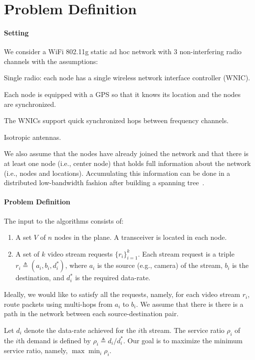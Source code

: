 \documentclass[12pt]{article}
\newenvironment{proof sketch}[1]{\noindent {\emph{Proof sketch of #1:}}}{\hfill \qed}
\newcommand{\eqdf}{\triangleq}
\begin{document}
\section{Problem Definition}\label{sec:problem}
\paragraph{Setting}
We consider a WiFi 802.11g static ad hoc network with $3$ non-interfering radio
channels with the assumptions:
\begin{inparaenum}[(i)]
\item Single radio: each node has a single wireless network interface
  controller (WNIC).
\item Each node is equipped with a GPS so that it knows
  its location and the nodes are synchronized.
\item The WNICs support quick synchronized hops between frequency
  channels.
\item Isotropic antennas.
\item We also assume that the nodes have already joined the network
  and that there is at least one node (i.e., center node) that holds
  full information about the network (i.e., nodes and locations).
  Accumulating this information can be done in a distributed
  low-bandwidth fashion after building a spanning
  tree~\cite{awerbuch1987optimal}.
\end{inparaenum}




\paragraph{Problem Definition}
The input to the algorithms consists of:
\begin{enumerate}
\item A set $V$ of $n$ nodes in the plane. A transceiver is located in
  each node.
\item A set of $k$ video stream requests $\{r_i\}_{i=1}^k$. Each
  stream request is a triple $r_i\eqdf (a_i,b_i,d^*_i)$, where $a_i$ is
  the source (e.g., camera) of the stream, $b_i$ is the destination,
  and $d^*_i$ is the required data-rate.
\end{enumerate}
Ideally, we would like to satisfy all the requests, namely, for each
video stream $r_i$, route packets using multi-hops from $a_i$ to $b_i$.
We assume that there is there is a path in the network between each
source-destination pair.

Let $d_i$ denote the data-rate achieved for the $i$th stream.  The
service ratio $\rho_i$ of the $i$th demand is defined by $\rho_i \eqdf
d_i/d^*_i$.  Our goal is to maximize the minimum service ratio,
namely, $\max \min_i \rho_i$.
\end{document}
